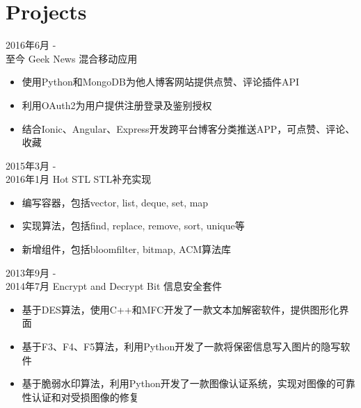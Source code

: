 \documentclass[a4paper]{twentysecondcv} %
\begin{document}

\section{Projects}

\begin{twenty} %

	
	\twentyitem
	{2016年6月 - \\至今}
	{Geek News}
	{混合移动应用}
	{}
	{
		{\begin{itemize}
				\item 使用Python和MongoDB为他人博客网站提供点赞、评论插件API
				\item 利用OAuth2为用户提供注册登录及鉴别授权
				\item 结合Ionic、Angular、Express开发跨平台博客分类推送APP，可点赞、评论、收藏
		\end{itemize}}
	}

	\twentyitem
	{2015年3月 - \\2016年1月}
	{Hot STL}
	{STL补充实现}
	{}
	{
		{\begin{itemize}
			\item 编写容器，包括vector, list, deque, set, map
			\item 实现算法，包括find, replace, remove, sort, unique等
			\item 新增组件，包括bloomfilter, bitmap, ACM算法库
		\end{itemize}}
	}
	
	\twentyitem
	{2013年9月 - \\2014年7月}
	{Encrypt and Decrypt Bit}
	{信息安全套件}
	{}
	{
		{\begin{itemize}
				\item 基于DES算法，使用C++和MFC开发了一款文本加解密软件，提供图形化界面
				\item 基于F3、F4、F5算法，利用Python开发了一款将保密信息写入图片的隐写软件
				\item 基于脆弱水印算法，利用Python开发了一款图像认证系统，实现对图像的可靠性认证和对受损图像的修复
		\end{itemize}}
	}
	
\end{twenty}

\end{document}
